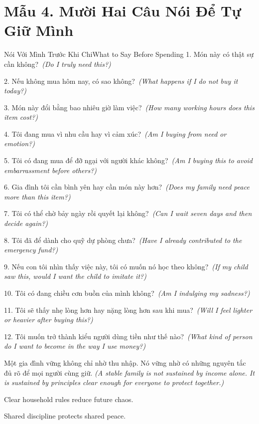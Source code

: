 \section*{Mẫu 4. Mười Hai Câu Nói Để Tự Giữ Mình}
\begin{truyen}{Nói Với Mình Trước Khi Chi}{What to Say Before Spending}
1. Món này có thật sự cần không?\
\textit{(Do I truly need this?)}

2. Nếu không mua hôm nay, có sao không?\
\textit{(What happens if I do not buy it today?)}

3. Món này đổi bằng bao nhiêu giờ làm việc?\
\textit{(How many working hours does this item cost?)}

4. Tôi đang mua vì nhu cầu hay vì cảm xúc?\
\textit{(Am I buying from need or emotion?)}

5. Tôi có đang mua để đỡ ngại với người khác không?\
\textit{(Am I buying this to avoid embarrassment before others?)}

6. Gia đình tôi cần bình yên hay cần món này hơn?\
\textit{(Does my family need peace more than this item?)}

7. Tôi có thể chờ bảy ngày rồi quyết lại không?\
\textit{(Can I wait seven days and then decide again?)}

8. Tôi đã để dành cho quỹ dự phòng chưa?\
\textit{(Have I already contributed to the emergency fund?)}

9. Nếu con tôi nhìn thấy việc này, tôi có muốn nó học theo không?\
\textit{(If my child saw this, would I want the child to imitate it?)}

10. Tôi có đang chiều cơn buồn của mình không?\
\textit{(Am I indulging my sadness?)}

11. Tôi sẽ thấy nhẹ lòng hơn hay nặng lòng hơn sau khi mua?\
\textit{(Will I feel lighter or heavier after buying this?)}

12. Tôi muốn trở thành kiểu người dùng tiền như thế nào?\
\textit{(What kind of person do I want to become in the way I use money?)}
\end{truyen}

\begin{baihoc}
Một gia đình vững không chỉ nhờ thu nhập. Nó vững nhờ có những nguyên tắc đủ rõ để mọi người cùng giữ.
\textit{(A stable family is not sustained by income alone. It is sustained by principles clear enough for everyone to protect together.)}
\end{baihoc}

\begin{ghinhoanh}
Clear household rules reduce future chaos.

Shared discipline protects shared peace.
\end{ghinhoanh}

\ngancach